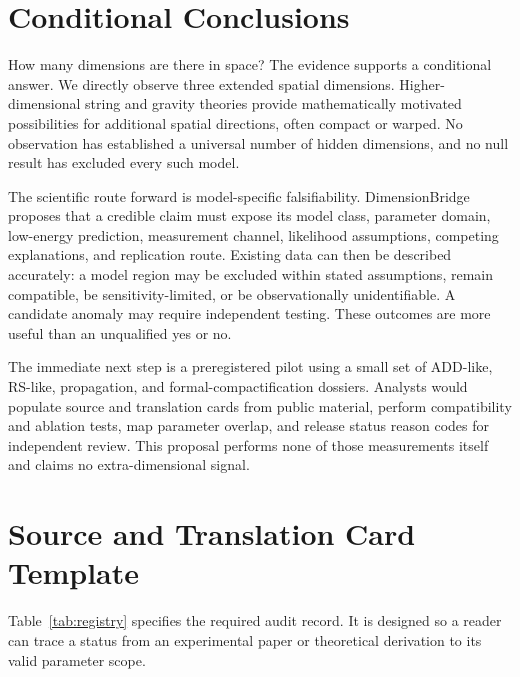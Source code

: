 \documentclass[conference]{IEEEtran}
\begin{document}
\section{Conditional Conclusions}

How many dimensions are there in space? The evidence supports a conditional answer. We directly observe three extended spatial dimensions. Higher-dimensional string and gravity theories provide mathematically motivated possibilities for additional spatial directions, often compact or warped. No observation has established a universal number of hidden dimensions, and no null result has excluded every such model.

The scientific route forward is model-specific falsifiability. DimensionBridge proposes that a credible claim must expose its model class, parameter domain, low-energy prediction, measurement channel, likelihood assumptions, competing explanations, and replication route. Existing data can then be described accurately: a model region may be excluded within stated assumptions, remain compatible, be sensitivity-limited, or be observationally unidentifiable. A candidate anomaly may require independent testing. These outcomes are more useful than an unqualified yes or no.

The immediate next step is a preregistered pilot using a small set of ADD-like, RS-like, propagation, and formal-compactification dossiers. Analysts would populate source and translation cards from public material, perform compatibility and ablation tests, map parameter overlap, and release status reason codes for independent review. This proposal performs none of those measurements itself and claims no extra-dimensional signal.

\appendices
\section{Source and Translation Card Template}

Table~\ref{tab:registry} specifies the required audit record. It is designed so a reader can trace a status from an experimental paper or theoretical derivation to its valid parameter scope.
\end{document}
